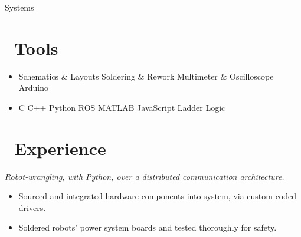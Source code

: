 \documentclass{resume}
\begin{document}

\begin{multicols}{3}
    \par
    \vfill \null
\columnbreak
    \par
    \par
    \centerline{\large{Systems}}
    \vfill \null
\columnbreak
    \vfill \null
\end{multicols}


\section{\faWrench\ Tools}

\begin{itemize}[parsep=0.5ex]
  \item %
  Schematics \& Layouts\textperiodcentered
  Soldering \& Rework\textperiodcentered
  Multimeter \& Oscilloscope\textperiodcentered
  Arduino
  \hfill \faBolt

  \item %
  C\textperiodcentered 
  C++\textperiodcentered
  Python\textperiodcentered
  ROS\textperiodcentered
  MATLAB\textperiodcentered
  JavaScript\textperiodcentered
  Ladder Logic
  \hfill \faCode

\end{itemize}

\section{\faLineChart\ Experience}

\textit{Robot-wrangling, with Python, over a distributed communication architecture.}
\begin{itemize}
  \item Sourced and integrated hardware components into system, via custom-coded drivers.
  \item Soldered robots' power system boards and tested thoroughly for safety.
\end{itemize}
\begin{comment}
  Informal intro to ML / N-nets, FK / IK, Grasping, FSM, DB (ES)
  People skills: pair-programming, 1-on-1, standups, blog posts, Happy Hour, AI planning, CI for internal processes, HW concept review
  Python fu: rapid prototyping / scripting AND enterprise-level code --> classes, exception-handling, logging, PDB debugging, linting, documentation
\end{comment}
\end{document}
